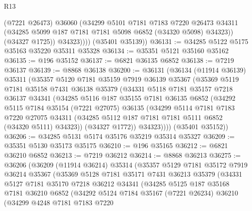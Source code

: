 \begin{lexlean}{R13}
\begin{coremodule}
                (@7221 @26473)
                @36060
                (@34299
                  @5101
                  @7181
                  @7183
                  @7220
                  @26473
                  @34311
                  (@34285 @5099 @187 @7181 @7181 @5098 @6852 (@34320 @5098) @34323))
                (@34327 @1725))
              @34323))))
      (@35401 @35139))
@36131 := @34285 @5122 @5175 @35163 @35220 @35311 @35328
@36134 := @35351 @5121 @35160 @35162
@36135 := @196 @35152
@36137 := @6821 @36135 @6852
@36138 := @7219 @36137
@36139 := @8868 @36138
@36200 := @36131
    (@36134
      (@11914 @36139)
      @35311
      (@35357
        @5120
        @7181
        @35159
        @7919
        @36139
        @35367
        (@35369
          @5119
          @7181
          @35158
          @7431
          @36138
          @35379
          (@34331
            @5118
            @7181
            @35157
            @7218
            @36137
            @34341
            (@34285
              @5116
              @187
              @35155
              @7181
              @36135
              @6852
              (@34292
                @5115
                @7184
                @35154
                (@7221 @27075)
                @36135
                (@34299
                  @5114
                  @7181
                  @7183
                  @7220
                  @27075
                  @34311
                  (@34285 @5112 @187 @7181 @7181 @5111 @6852 (@34320 @5111) @34323))
                (@34327 @1772))
              @34323))))
      (@35401 @35152))
@36206 := @34285 @5131 @5174 @35176 @35219 @35314 @35327
@36209 := @35351 @5130 @35173 @35175
@36210 := @196 @35165
@36212 := @6821 @36210 @6852
@36213 := @7219 @36212
@36214 := @8868 @36213
@36275 := @36206
    (@36209
      (@11914 @36214)
      @35314
      (@35357
        @5129
        @7181
        @35172
        @7919
        @36214
        @35367
        (@35369
          @5128
          @7181
          @35171
          @7431
          @36213
          @35379
          (@34331
            @5127
            @7181
            @35170
            @7218
            @36212
            @34341
            (@34285
              @5125
              @187
              @35168
              @7181
              @36210
              @6852
              (@34292
                @5124
                @7184
                @35167
                (@7221 @26234)
                @36210
                (@34299
                  @4248
                  @7181
                  @7183
                  @7220

\end{coremodule}
\end{lexlean}
